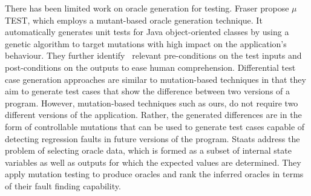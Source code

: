 There has been limited work on oracle generation for testing. 
Fraser \etal \cite{fraser:tse12} propose $\mu$TE\-ST, which employs a mutant-based oracle generation technique.  It automatically generates unit tests for Java object-oriented classes by using a genetic algorithm to target mutations with high impact on the application's behaviour. They further identify~\cite{fraser:issta11} relevant pre-conditions on the test inputs and post-conditions on the outputs to ease human comprehension.
Differential test case generation approaches \cite{taneja:ase08, elbaum:tse09} are similar to mutation-based techniques in that they aim to generate test cases that show the difference between two versions of a program. However, mutation-based techniques such as ours, do not require two different versions of the application.
Rather, the generated differences are in the form of controllable mutations that can be used to generate test cases capable of detecting
regression faults in future versions of the program.
Staats \etal \cite{staats:icse12} address the problem of selecting oracle data, which is formed as a subset of internal state variables as well as outputs for which the expected values are determined.
They apply mutation testing to produce oracles and rank the inferred oracles in terms of their fault finding capability. 

